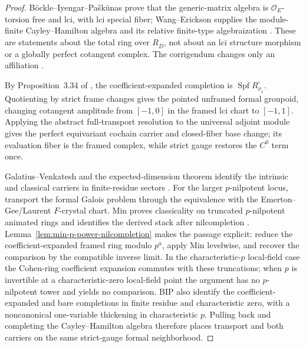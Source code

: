 \documentclass[11pt]{article}
\theoremstyle{definition}
\begin{document}
\begin{proof}
B\"ockle--Iyengar--Pa\v{s}k\=unas prove that the generic-matrix algebra is $\mathcal O_E$-torsion free and lci, with lci special fiber; Wang--Erickson supplies the module-finite Cayley--Hamilton algebra and its relative finite-type algebraization \cite{BIPLocal,WangEricksonFamilies}.  These are statements about the total ring over $R_{\bar D}$, not about an lci structure morphism or a globally perfect cotangent complex.  The corrigendum changes only an affiliation \cite{BIPCorrigendum}.

By Proposition~3.34 of \cite{BIPLocal}, the coefficient-expanded completion is $\operatorname{Spf}R_{\rho_x}^{\square}$.  Quotienting by strict frame changes gives the pointed unframed formal groupoid, changing cotangent amplitude from $[-1,0]$ in the framed lci chart to $[-1,1]$.  Applying the abstract full-transport resolution to the universal adjoint module gives the perfect equivariant cochain carrier and closed-fiber base change; its evaluation fiber is the framed complex, while strict gauge restores the $C^0$ term once.

Galatius--Venkatesh and the expected-dimension theorem identify the intrinsic and classical carriers in finite-residue sectors \cite{GalatiusVenkatesh,BIPLocal}.  For the larger $p$-nilpotent locus, transport the formal Galois problem through the equivalence with the Emerton--Gee/Laurent $F$-crystal chart.  Min proves classicality on truncated $p$-nilpotent animated rings and identifies the derived stack after nilcompletion \cite[Theorems~1.1 and~1.2]{MinDerivedEG}.  Lemma~\ref{lem:min-p-power-nilcompletion} makes the passage explicit: reduce the coefficient-expanded framed ring modulo $p^a$, apply Min levelwise, and recover the comparison by the compatible inverse limit.  In the characteristic-$p$ local-field case the Cohen-ring coefficient expansion commutes with these truncations; when $p$ is invertible at a characteristic-zero local-field point the argument has no $p$-nilpotent tower and yields no comparison.  BIP also identify the coefficient-expanded and bare completions in finite residue and characteristic zero, with a noncanonical one-variable thickening in characteristic $p$.  Pulling back and completing the Cayley--Hamilton algebra therefore places transport and both carriers on the same strict-gauge formal neighborhood.
\end{proof}
\end{document}

